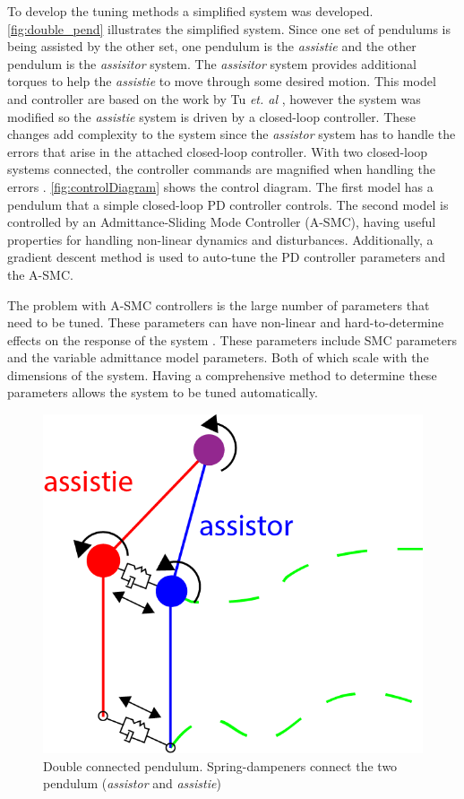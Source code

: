 To develop the tuning methods a simplified system was developed. \autoref{fig:double_pend} illustrates the simplified system. Since one set of pendulums is being assisted by the other set, one pendulum is the \textit{assistie} and the other pendulum is the \textit{assisitor} system. The \textit{assisitor} system provides additional torques to help the \textit{assistie} to move through some desired motion. This model and controller are based on the work by Tu \textit{et. al} \cite{tu2020adaptive}, however the system was modified so the \textit{assistie} system is driven by a closed-loop controller. These changes add complexity to the system since the \textit{assistor} system has to handle the errors that arise in the attached closed-loop controller. With two closed-loop systems connected, the controller commands are magnified when handling the errors \cite{tu2020adaptive}. \autoref{fig:controlDiagram} shows the control diagram. The first model has a pendulum that a simple closed-loop PD controller controls. The second model is controlled by an Admittance-Sliding Mode Controller (A-SMC), having useful properties for handling non-linear dynamics and disturbances. Additionally, a gradient descent method is used to auto-tune the PD controller parameters and the A-SMC. 

The problem with A-SMC controllers is the large number of parameters that need to be tuned. These parameters can have non-linear and hard-to-determine effects on the response of the system \cite{slotine1983tracking}. These parameters include SMC parameters and the variable admittance model parameters. Both of which scale with the dimensions of the system. Having a comprehensive method to determine these parameters allows the system to be tuned automatically.  

\begin{figure}
    \centering
    \includegraphics[scale=1.5]{images/controllers/double_pend.png}
    \caption[Double connected pendulum]{Double connected pendulum. Spring-dampeners connect the two pendulum (\textit{assistor} and \textit{assistie}) }
    \label{fig:double_pend}
\end{figure}

